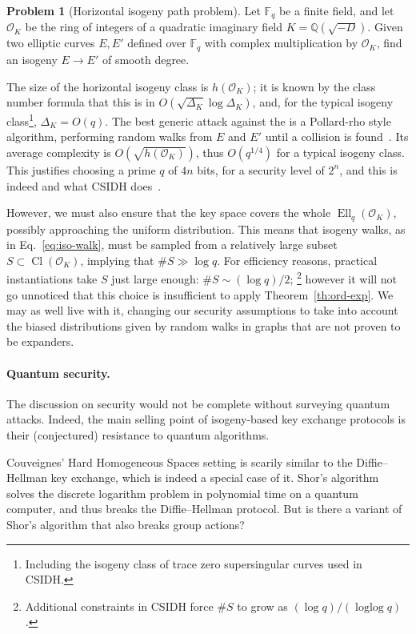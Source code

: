 \documentclass[10pt]{article}
\theoremstyle{plain}
\theoremstyle{definition}
\newtheorem{problem}{Problem}
\DeclareMathOperator{\loglog}{loglog}
\DeclareMathOperator{\Cl}{Cl}
\DeclareMathOperator{\Ell}{Ell}
\def\F{\ensuremath{\mathbb{F}}}
\def\O{\ensuremath{\mathcal{O}}}
\begin{document}
\begin{prposition}
\begin{problem}[Horizontal isogeny path problem]
  \label{prob:hiwp}
  Let $\F_q$ be a finite field, and let $\O_K$ be the ring of integers
  of a quadratic imaginary field $K=ℚ(\sqrt{-D})$. %
  Given two elliptic curves $E,E'$ defined over $\F_q$ with complex
  multiplication by $\O_K$, find an isogeny $E→E'$ of smooth degree.
\end{problem}

The size of the horizontal isogeny class is $h(\O_K)$; it is known by
the class number formula that this is in $O(\sqrt{Δ_K}\log Δ_K)$, and,
for the typical isogeny class\footnote{Including the isogeny class of
  trace zero supersingular curves used in CSIDH.}, $Δ_K=O(q)$. %
The best generic attack against the  is a
Pollard-rho style algorithm, performing random walks from $E$ and $E'$
until a collision is found~\cite{GHS}. %
Its average complexity is $O(\sqrt{h(\O_K)})$, thus $O(q^{1/4})$ for a
typical isogeny class. %
This justifies choosing a prime $q$ of $4n$ bits, for a security level
of $2^n$, and this is indeed and what CSIDH
does~\cite{AC:CLMPR18}.

However, we must also ensure that the key space covers the whole
$\Ell_q(\O_K)$, possibly approaching the uniform distribution. %
This means that isogeny walks, as in Eq.~\eqref{eq:iso-walk}, must be
sampled from a relatively large subset $S⊂\Cl(\O_K)$, implying that
$\#S\gg \log q$. %
For efficiency reasons, practical instantiations take $S$ just large
enough: $\#S\sim (\log q)/2$;%
\footnote{Additional constraints in CSIDH force $\#S$ to grow as
  $(\log q)/(\loglog q)$.} %
however it will not go unnoticed that this choice is insufficient to
apply Theorem~\ref{th:ord-exp}. %
We may as well live with it, changing our security assumptions to take
into account the biased distributions given by random walks in graphs
that are not proven to be expanders. %

\paragraph{Quantum security.}
The discussion on security would not be complete without surveying
quantum attacks. %
Indeed, the main selling point of isogeny-based key exchange protocols
is their (conjectured) resistance to quantum algorithms. %

Couveignes' Hard Homogeneous Spaces setting is scarily similar to the
Diffie--Hellman key exchange, which is indeed a special case of it. %
Shor's algorithm~\cite{FOCS:Shor94} solves the discrete logarithm
problem in polynomial time on a quantum computer, and thus breaks the
Diffie--Hellman protocol. %
But is there a variant of Shor's algorithm that also breaks group
actions? %


\end{prposition}
\end{document}
